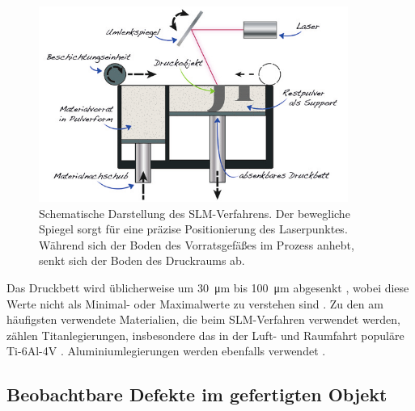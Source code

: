 		\begin{figure}[!ht]
			\centering
			\includegraphics[width=0.9\textwidth]{chapter/main/img/sls_slm.png}
			\caption[Schematische Darstellung des SLM-Verfahrens]{Schematische Darstellung des
			SLM-Verfahrens. Der bewegliche Spiegel sorgt für eine präzise Positionierung des
			Laserpunktes. Während sich der Boden des Vorrats\-gefäßes im Prozess anhebt, senkt
			sich der Boden des Druckraums ab. \cite[S. 119]{horsch20143d}}
			\label{fig:slm_sls}
		\end{figure}

		Das Druckbett wird üblicherweise um \SI{30}{\micro\meter} bis \SI{100}{\micro\meter}
		abgesenkt \cite{song2012effects}, wobei diese Werte nicht als Minimal- oder Maximalwerte
		zu verstehen sind \cite{shi2016performance}. Zu den am häufigsten verwendete Materialien,
		die beim SLM-Verfahren verwendet werden, zählen Titanlegierungen, insbesondere das in der
		Luft- und Raumfahrt populäre Ti-6Al-4V
		\cite{song2012effects,shi2016performance,brandl2012morphology}. Aluminiumlegierungen
		werden ebenfalls verwendet \cite[je Al-Si-10Mg]{yan2020comparative,zou2017study}.

	\subsection{Beobachtbare Defekte im gefertigten Objekt}
